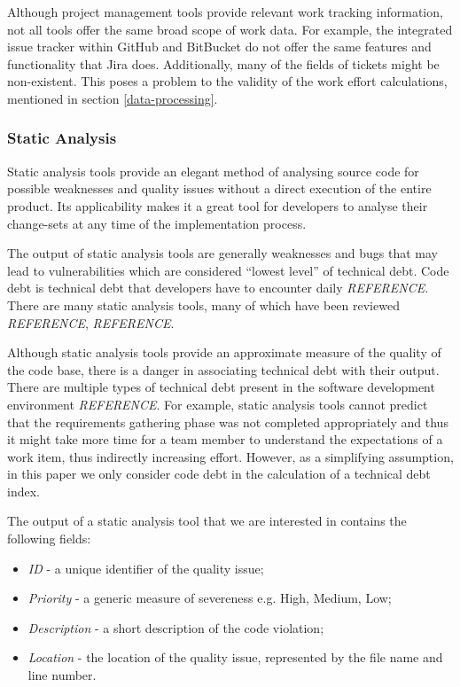 \documentclass{mpaper}
\begin{document}
Although project management tools provide relevant work tracking information,
not all tools offer the same broad scope of work data. For example, the
integrated issue tracker within GitHub and BitBucket do not offer the same
features and functionality that Jira does. Additionally, many of the fields of
tickets might be non-existent. This poses a problem to the validity of the work
effort calculations, mentioned in section \ref{data-processing}. 

\subsubsection*{Static Analysis}
\label{static-analysis}

Static analysis tools provide an elegant method of analysing source code for
possible weaknesses and quality issues without a direct execution of the entire
product. Its applicability makes it a great tool for developers to analyse their
change-sets at any time of the implementation process.

The output of static analysis tools are generally weaknesses and bugs that may
lead to vulnerabilities which are considered ``lowest level'' of technical debt.
Code debt is technical debt that developers have to encounter daily
\emph{REFERENCE}. There are many static analysis tools, many of which have been
reviewed \emph{REFERENCE}, \emph{REFERENCE}. 

Although static analysis tools provide an approximate measure of the quality of
the code base, there is a danger in associating technical debt with their
output. There are multiple types of technical debt present in the software
development environment \emph{REFERENCE}. For example, static analysis tools
cannot predict that the requirements gathering phase was not completed
appropriately and thus it might take more time for a team member to understand
the expectations of a work item, thus indirectly increasing effort. However, as
a simplifying assumption, in this paper we only consider code debt in the
calculation of a technical debt index. 

The output of a static analysis tool that we are interested in contains the
following fields:

\begin{itemize}
  \item \emph{ID} - a unique identifier of the quality issue;
  \item \emph{Priority} - a generic measure of severeness e.g. High, Medium,
  Low;
  \item \emph{Description} - a short description of the code violation;
  \item \emph{Location} - the location of the quality issue, represented by the
  file name and line number. 
\end{itemize}
\end{document}
